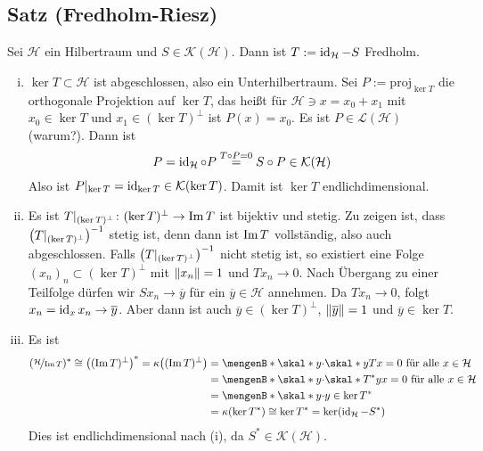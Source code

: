 \subsection{Satz (Fredholm-Riesz)} %
\label{sub:92}
Sei $\mathcal{H}$ ein Hilbertraum und $S \in \mathcal{K}(\mathcal{H})$. Dann ist $T := \id_\mathcal{H}-S$ Fredholm.
\begin{enumerate}[(i)]
	\item $\ker T \subset \mathcal{H}$ ist abgeschlossen, also ein Unterhilbertraum. Sei $P := \mathrm{proj}_{\ker T}$ die orthogonale Projektion auf $\ker T$, das heißt 
	für $\mathcal{H} \ni x = x_0 + x_1$ mit $x_0 \in \ker T$ und $x_1 \in (\ker T)^\bot$ ist $P(x)=x_0$. Es ist $P \in \mathcal{L}(\mathcal{H})$ (warum?).
	Dann ist 
	\[
		P=\id_\mathcal{H} \circ P \stackrel{T \circ P=0}{=} S \circ P \in \mathcal{K}(\mathcal{H})
	\]
	Also ist $P|_{\ker T} = \id_{\ker T} \in \mathcal{K}(\ker T)$. Damit ist $\ker T$ endlichdimensional.
	\item Es ist $T|_{(\ker T)^\bot} \colon (\ker T)^\bot \to \im T$ ist bijektiv und stetig. Zu zeigen ist, dass $\enbrace*{T|_{(\ker T)^\bot}} ^{-1}$ stetig ist, denn dann
	ist $\im T$ vollständig, also auch abgeschlossen. Falls $\enbrace*{T|_{(\ker T)^\bot}}^{-1}$ nicht stetig ist, so existiert eine Folge $(x_n)_n \subset (\ker T)^\bot$
	mit $\norm{x_n}=1$ und $T x_n \to 0$. Nach Übergang zu einer Teilfolge dürfen wir $S x_n \to \overline{y}$ für ein $\overline{y} \in \mathcal{H}$ annehmen. Da
	$T x_n \to 0$, folgt $x_n = \id_x x_n \to \overline{y}$. Aber dann ist auch $\overline{y} \in (\ker T)^\bot$, $\norm{\overline{y}}=1$ und $\overline{y} \in \ker T$. 
	\light
	\item Es ist 
	\begin{align*}
		(\nicefrac{\mathcal{H}}{\im T})^* \cong\enbrace*{(\im T)^\bot}^* = \kappa \enbrace*{(\im T)^\bot} 
		&= \set[\skal*{y}{\cdot}]{\skal*{y}{T x}=0 \text{ für alle }x \in \mathcal{H}} \\
		&= \set[\skal*{y}{\cdot }]{\skal*{T^*y}{x}=0 \text{ für alle }x \in \mathcal{H}} \\
		&= \set[\skal*{y}{\cdot}]{y \in \ker T^*} \\
		&= \kappa \enbrace*{\ker T^*}  \cong \ker T^* = \ker(\id_\mathcal{H}- S^*)
	\end{align*}
	Dies ist endlichdimensional nach (i), da $S^* \in \mathcal{K}(\mathcal{H})$.\bewende
\end{enumerate}

